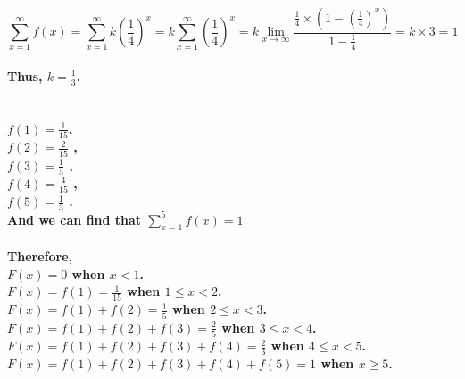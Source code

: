 \documentclass{article}
\begin{document}
        \paragraph{$$\sum _{x=1} ^\infty f(x)=\sum _{x=1} ^\infty k (\frac{1}{4})^x=k\sum _{x=1} ^\infty (\frac{1}{4})^x=k \lim _{x\rightarrow \infty} \frac{\frac{1}{4}\times(1-(\frac{1}{4})^x)}{1-\frac{1}{4}}=k\times 3 =1$$}
        \paragraph{Thus, $k=\frac{1}{3}$.}

    \section{}
    \paragraph{
        $f(1)=\frac{1}{15}$,   \\    
        $f(2)=\frac{2}{15}$ ,   \\
        $f(3)=\frac{1}{5}$  ,  \\
        $f(4)=\frac{4}{15}$ ,  \\
        $f(5)=\frac{1}{3}$  .\\
        And we can find that $\sum _{x=1} ^ 5 f(x)=1$
    }

    \paragraph{Therefore,\\
        $F(x)=0$ when $x< 1$.\\
        $F(x)=f(1)=\frac{1}{15}$ when $1\leq x< 2$.\\
        $F(x)=f(1) +f(2)=\frac{1}{5}$ when $2\leq x< 3$.\\
        $F(x)=f(1)+f(2)+f(3)=\frac{2}{5}$ when $3\leq x< 4$.\\
        $F(x)=f(1)+f(2)+f(3)+f(4)=\frac{2}{3}$ when $4\leq x< 5$.\\
        $F(x)=f(1)+f(2)+f(3)+f(4)+f(5)=1$ when $x\geq 5$.
    }

    \section{}
        \subsection{}
\end{document}
